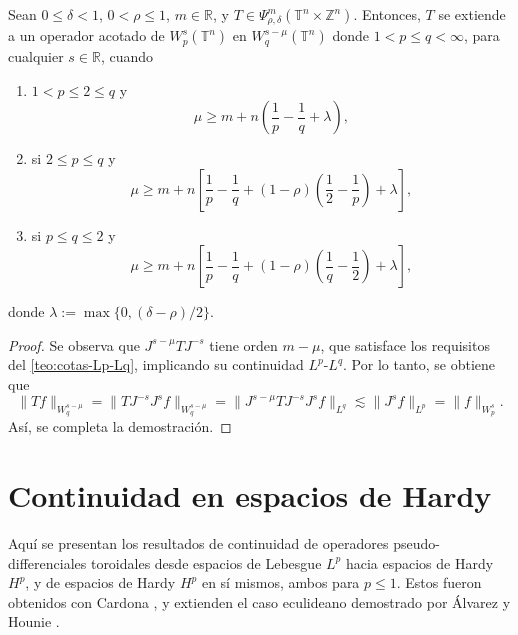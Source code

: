 \begin{theorem}
	Sean $0\leq\delta<1$, $0<\rho\leq 1$, $m\in\mathbb{R}$, y $T\in \Psi^m_{\rho,\delta}(\mathbb{T}^n\times\mathbb{Z}^n)$. Entonces, $T$ se extiende a un operador acotado de $W^{s}_p(\mathbb{T}^n)$ en $W^{s-\mu}_q (\mathbb{T}^n)$ donde $1<p\leq q<\infty$, para cualquier $s\in\mathbb{R}$, cuando 
	\begin{enumerate}
		\item $1<p\leq 2 \leq q$ y 
		\begin{equation*}
			\mu \geq m + n \left( \frac{1}{p} - \frac{1}{q} + \lambda
			\right),
		\end{equation*}
		\item si $2 \leq p \leq q$ y 
		\begin{equation*}
			\mu \geq m + n \left[ \frac{1}{p} - \frac{1}{q} + (1-\rho) \left( \frac{1}{2} - \frac{1}{p}
			\right)
			+ \lambda
			\right],
		\end{equation*}
		\item si $p\leq q \leq 2$ y 
		\begin{equation*}
			\mu \geq m + n \left[ \frac{1}{p} - \frac{1}{q} + (1-\rho) \left( \frac{1}{q} - \frac{1}{2}
			\right)
			+ \lambda
			\right],
		\end{equation*}
	\end{enumerate}
	donde $\lambda := \max\{ 0, (\delta-\rho)/2 \}$. 
\end{theorem}
\begin{proof}
	Se observa que $J^{s-\mu}T J^{-s}$ tiene orden $m-\mu$, que satisface los requisitos del \cref{teo:cotas-Lp-Lq}, implicando su continuidad $L^p$-$L^q$. Por lo tanto, se obtiene que
	\begin{equation*}
		\|T f\|_{W^{s-\mu}_q} = \|T J^{-s}J^sf\|_{W^{s-\mu}_q} 
		= \|J^{s-\mu}T J^{-s}J^sf\|_{L^q}
		\lesssim \|J^sf\|_{L^p} = \|f\|_{W^s_p}. 
	\end{equation*}
	Así, se completa la demostración.
\end{proof}

\section{Continuidad en espacios de Hardy}
Aquí se presentan los resultados de continuidad de operadores pseudo-differenciales toroidales desde espacios de Lebesgue $L^p$ hacia espacios de Hardy $H^p$, y de espacios de Hardy $H^p$ en sí mismos, ambos para $p\leq 1$. Estos fueron obtenidos con Cardona \cite{cardona-martinez-II}, y extienden el caso eculideano demostrado por \'Alvarez y Hounie \cite{alvarez-hounie}.
